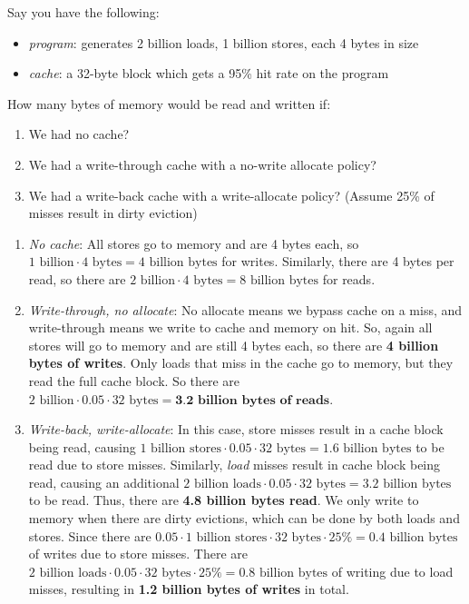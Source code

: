 \begin{problem}
  Say you have the following:
  \begin{itemize}
    \item \emph{program}: generates 2 billion loads, 1 billion stores, each 4 bytes in size
    \item \emph{cache}: a 32-byte block which gets a 95\% hit rate on the program
  \end{itemize}
  How many bytes of memory would be read and written if:
  \begin{enumerate}[label=\alph*]
    \item We had no cache?
    \item We had a write-through cache with a no-write allocate policy?
    \item We had a write-back cache with a write-allocate policy? (Assume 25\% of misses result in dirty eviction)
  \end{enumerate}
\end{problem}
\begin{answer} \:
  \begin{enumerate}[label=\alph*]
    \item \emph{No cache}: All stores go to memory and are 4 bytes each, so \(1 \text{ billion} \cdot 4 \text{ bytes} = 4 \text{ billion bytes}\) for writes. Similarly, there are 4 bytes per read, so there are \(2 \text{ billion} \cdot 4 \text{ bytes} = 8 \text{ billion bytes}\) for reads.
    \item \emph{Write-through, no allocate}: No allocate means we bypass cache on a miss, and write-through means we write to cache and memory on hit. So, again all stores will go to memory and are still 4 bytes each, so there are \textbf{4 billion bytes of writes}. Only loads that miss in the cache go to memory, but they read the full cache block. So there are \(2 \text{ billion} \cdot 0.05 \cdot 32 \text{ bytes} = \textbf{3.2 billion bytes of reads}\).
    \item \emph{Write-back, write-allocate}: In this case, store misses result in a cache block being read, causing \(1 \text{ billion stores} \cdot 0.05 \cdot 32 \text{ bytes} = 1.6 \text{ billion bytes}\) to be read due to store misses. Similarly, \emph{load} misses result in cache block being read, causing an additional \(2 \text{ billion loads} \cdot 0.05 \cdot 32 \text{ bytes} = 3.2 \text{ billion bytes} \) to be read. Thus, there are \textbf{4.8 billion bytes read}. We only write to memory when there are dirty evictions, which can be done by both loads and stores. Since there are \(0.05 \cdot 1 \text{ billion stores} \cdot 32 \text{ bytes} \cdot 25\% = 0.4 \text{ billion bytes} \) of writes due to store misses. There are \(2 \text{ billion loads} \cdot 0.05 \cdot 32 \text{ bytes}  \cdot 25\% = 0.8 \text{ billion bytes} \) of writing due to load misses, resulting in \textbf{1.2 billion bytes of writes} in total.
  \end{enumerate}
\end{answer}

